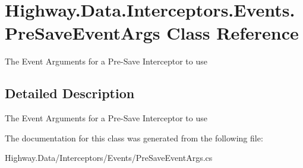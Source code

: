 \hypertarget{class_highway_1_1_data_1_1_interceptors_1_1_events_1_1_pre_save_event_args}{\section{Highway.\-Data.\-Interceptors.\-Events.\-Pre\-Save\-Event\-Args Class Reference}
\label{class_highway_1_1_data_1_1_interceptors_1_1_events_1_1_pre_save_event_args}
}


The Event Arguments for a Pre-\/\-Save Interceptor to use  




\subsection{Detailed Description}
The Event Arguments for a Pre-\/\-Save Interceptor to use 



The documentation for this class was generated from the following file\-:\begin{DoxyCompactItemize}
\item 
Highway.\-Data/\-Interceptors/\-Events/Pre\-Save\-Event\-Args.\-cs\end{DoxyCompactItemize}
